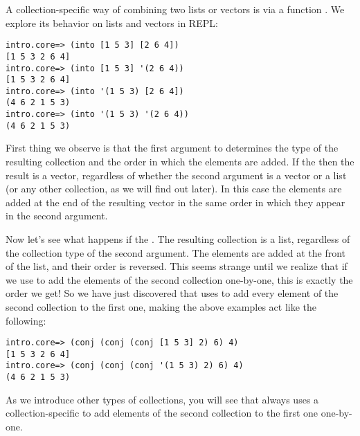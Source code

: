 A collection-specific way of combining two lists or vectors is via a function . We explore its behavior on lists and vectors in REPL:
\begin{framed}
\begin{verbatim}
intro.core=> (into [1 5 3] [2 6 4])
[1 5 3 2 6 4]
intro.core=> (into [1 5 3] '(2 6 4))
[1 5 3 2 6 4]
intro.core=> (into '(1 5 3) [2 6 4])
(4 6 2 1 5 3)
intro.core=> (into '(1 5 3) '(2 6 4))
(4 6 2 1 5 3)
\end{verbatim}
\end{framed}
First thing we observe is that the first argument to  determines the type of the resulting collection and the order in which the elements are added. If the  then the result is a vector, regardless of whether the second argument is a vector or a list (or any other collection, as we will find out later). In this case the elements are added at the end of the resulting vector in the same order in which they appear in the second argument. 

Now let's see what happens if the . The resulting collection is a list, regardless of the collection type of the second argument. The elements are added at the front of the list, and their order is reversed. This seems strange until we realize that if we use  to add the elements of the second collection one-by-one, this is exactly the order we get! So we have just discovered that  uses  to add every element of the second collection to the first one, making the above examples act like the following: 
\begin{framed}
\begin{verbatim}
intro.core=> (conj (conj (conj [1 5 3] 2) 6) 4)
[1 5 3 2 6 4]
intro.core=> (conj (conj (conj '(1 5 3) 2) 6) 4)
(4 6 2 1 5 3)
\end{verbatim}
\end{framed}
As we introduce other types of collections, you will see that  always uses a collection-specific  to add elements of the second collection to the first one one-by-one. 

